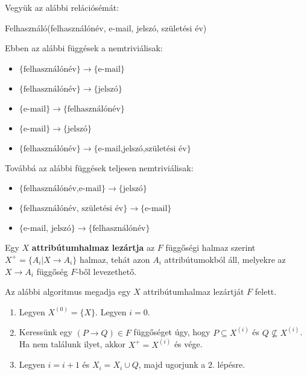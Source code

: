 \begin{pld}
Vegyük az alábbi relációsémát:
\begin{center}
    Felhasználó(felhasználónév, e-mail, jelszó, születési év)
\end{center}
Ebben az alábbi függések a nemtriviálisak:
\begin{itemize}
    \item $\{\text{felhasználónév}\}\longrightarrow \{\text{e-mail}\}$
    \item $\{\text{felhasználónév}\}\longrightarrow \{\text{jelszó}\}$
    \item $\{\text{e-mail}\}\longrightarrow \{\text{felhasználónév}\}$
    \item $\{\text{e-mail}\}\longrightarrow \{\text{jelszó}\}$
    \item $\{\text{felhasználónév}\}\longrightarrow \{\text{e-mail,jelszó,születési év}\}$
\end{itemize}
Továbbá az alábbi függések teljesen nemtriviálisak:
\begin{itemize}
    \item $\{\text{felhasználónév,e-mail}\}\longrightarrow \{\text{jelszó}\}$
    \item $\{\text{felhasználónév, születési év}\}\longrightarrow \{\text{e-mail}\}$
    \item $\{\text{e-mail, jelszó}\}\longrightarrow \{\text{felhasználónév}\}$
\end{itemize}
\end{pld}

\begin{defi}
Egy $X$ \textbf{attribútumhalmaz lezártja} az $F$ függőségi halmaz szerint $X^+ = \{ A_i | X \longrightarrow A_i\}$ halmaz, tehát azon $A_i$ attribútumokból áll, melyekre az $X \longrightarrow A_i$ függőség $F$-ből levezethető.
\end{defi}

\begin{tet} \label{closedAttribute}
Az alábbi algoritmus megadja egy $X$ attribútumhalmaz lezártját $F$ felett.
\begin{enumerate}
    \item Legyen $X^{(0)} = \{X\}$. Legyen $i = 0$.
    \item Keressünk egy $(P \longrightarrow Q) \in F$ függőséget úgy, hogy $P \subseteq X^{(i)}$ és $Q \not\subseteq X^{(i)}$. Ha nem találunk ilyet, akkor $X^+ = X^{(i)}$ és vége.
    \item Legyen $i = i + 1$ és $X_i = X_i \cup Q$, majd ugorjunk a $2.$ lépésre.
\end{enumerate}
\end{tet}

